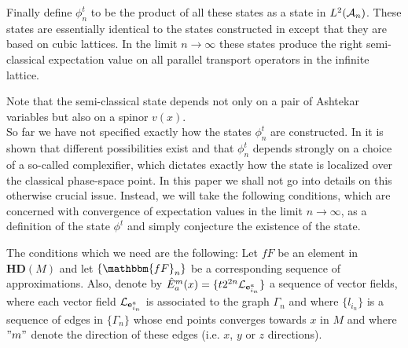 \documentclass[12pt]{article}
\def\G{\Gamma}
\def\ca{{\cal A}}
\def\cl{{\cal L}}
\begin{document}
Finally define $\phi^t_n$ to be the product of all these states as a state in $L^2(\ca_{n})$. These states are essentially identical to the states constructed in \cite{TW} except that they are based on cubic lattices.
In the limit $n\rightarrow\infty$ these states produce the right semi-classical expectation value on all parallel transport operators in the infinite lattice. 

Note that the semi-classical state depends not only on a pair of Ashtekar variables but also on a spinor $v(x)$. \\



So far we have not specified exactly how the states $\phi^t_n$ are constructed. In \cite{BT1,TW,BT2} it is shown that different possibilities exist and that $\phi^t_n$ depends strongly on a choice of a so-called complexifier, which dictates exactly how the state is localized over the classical phase-space point. In this paper we shall not go into details on this otherwise crucial issue. Instead, we will take the following conditions, which are concerned with convergence of expectation values in the limit $n\rightarrow\infty$, as a definition of the state $\phi^t$ and simply conjecture the existence of the state. 

The conditions which we need are the following:  Let $fF$ be an element in $\mathbf{HD}(M) $ and let $\{\mathbbm{fF}_n\}$ be a corresponding sequence of approximations. Also, denote by $\hat{E}^m_a(x) =\{ t 2^{2n} \cl_{{\bf e}^a_{i_n}} \}$ a sequence of vector fields, where each vector field $\cl_{{\bf e}^a_{i_n}}$ is associated to the graph $\G_n$ and where $\{l_{i_n}\}$ is a sequence of edges in $\{\G_n\}$ whose end points converges towards $x$ in $M$ and where $"m"$ denote the direction of these edges (i.e. $x$, $y$ or $z$ directions). 
\end{document}
